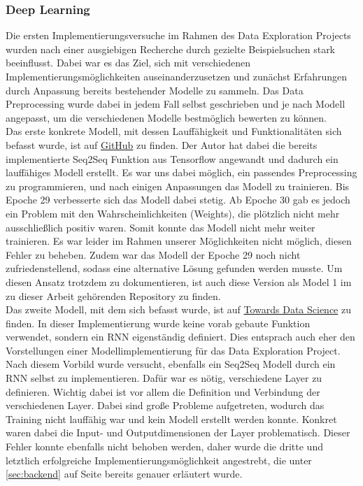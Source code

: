 \documentclass{aa}
\begin{document}
        \subsubsection{Deep Learning}
            Die ersten Implementierungsversuche im Rahmen des Data Exploration Projects wurden nach einer ausgiebigen Recherche durch gezielte Beispielsuchen stark beeinflusst. Dabei war es das Ziel, sich mit verschiedenen Implementierungsmöglichkeiten auseinanderzusetzen und zunächst Erfahrungen durch Anpassung bereits bestehender Modelle zu sammeln. Das Data Preprocessing wurde dabei in jedem Fall selbst geschrieben und je nach Modell angepasst, um die verschiedenen Modelle bestmöglich bewerten zu können.\\
            Das erste konkrete Modell, mit dessen Lauffähigkeit und Funktionalitäten sich befasst wurde, ist auf \href{https://github.com/tensorlayer/seq2seq-chatbot}{GitHub} zu finden. \cite[Vgl.]{tensorlayer} Der Autor hat dabei die bereits implementierte Seq2Seq Funktion aus Tensorflow angewandt und dadurch ein lauffähiges Modell erstellt. Es war uns dabei möglich, ein passendes Preprocessing zu programmieren, und nach einigen Anpassungen das Modell zu trainieren. Bis Epoche 29 verbesserte sich das Modell dabei stetig. Ab Epoche 30 gab es jedoch ein Problem mit den Wahrscheinlichkeiten (Weights), die plötzlich nicht mehr ausschließlich positiv waren. Somit konnte das Modell nicht mehr weiter trainieren. Es war leider im Rahmen unserer Möglichkeiten nicht möglich, diesen Fehler zu beheben. Zudem war das Modell der Epoche 29 noch nicht zufriedenstellend, sodass eine alternative Lösung gefunden werden musste. Um diesen Ansatz trotzdem zu dokumentieren, ist auch diese Version als Model 1 im zu dieser Arbeit gehörenden Repository zu finden.\\
            Das zweite Modell, mit dem sich befasst wurde, ist auf \href{https://towardsdatascience.com/how-to-implement-seq2seq-lstm-model-in-keras-shortcutnlp-6f355f3e5639}{Towards Data Science} zu finden. \cite[Vgl.]{takezawa} In dieser Implementierung wurde keine vorab gebaute Funktion verwendet, sondern ein RNN eigenständig definiert. Dies entsprach auch eher den Vorstellungen einer Modellimplementierung für das Data Exploration Project. Nach diesem Vorbild wurde versucht, ebenfalls ein Seq2Seq Modell durch ein RNN selbst zu implementieren. Dafür war es nötig, verschiedene Layer zu definieren. Wichtig dabei ist vor allem die Definition und Verbindung der verschiedenen Layer. Dabei sind große Probleme aufgetreten, wodurch das Training nicht lauffähig war und kein Modell erstellt werden konnte. Konkret waren dabei die Input- und Outputdimensionen der Layer problematisch. Dieser Fehler konnte ebenfalls nicht behoben werden, daher wurde die dritte und letztlich erfolgreiche Implementierungsmöglichkeit angestrebt, die unter \ref{sec:backend} auf Seite \pageref{sec:backend} bereits genauer erläutert wurde.\\
            
\end{document}
